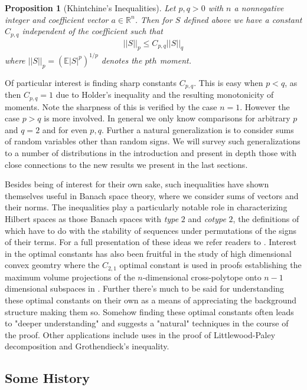 \documentclass[10pt]{article}
\newcommand{\E}{\mathbb{E}}
\newcommand{\1}{\textbf{1}}
\newcommand{\R}{\mathbb{R}}
\newcommand{\norm}[1]{\left\lvert\left\lvert#1\right\rvert\right\rvert}
\newcommand{\normOne}[1]{\left\lvert#1\right\rvert}
\newcommand{\lparen}{\left(}
\newcommand{\rparen}{\right)}
\newtheorem{prop}{Proposition}[subsection]
\theoremstyle{remark}
\theoremstyle{definition}
\begin{document}
\begin{prop}[Khintchine's Inequalities]

	Let $p,q > 0$ with $n$ a nonnegative integer and coefficient vector $a \in \R^n$. Then for $S$ defined above we have a constant $C_{p,q}$ independent of the coefficient such that
	\begin{align*}
		\norm{S}_p \leq C_{p,q} \norm{S}_q
	\end{align*}
	where $\norm{S}_p = \lparen\E\normOne{S}^p\rparen^{1/p}$ denotes the $pth$ moment.
\end{prop}

Of particular interest is finding sharp constants $C_{p,q}$. This is easy when $p < q$, as then $C_{p,q} = 1$ due to Holder's inequality and the resulting monotonicity of moments. Note the sharpness of this is verified by the case $n=1$. However the case $p > q$ is more involved. In general we only know comparisons for arbitrary $p$ and $q=2$ and for even $p,q$. Further a natural generalization is to consider sums of random variables other than random signs. We will survey such generalizations to a number of distributions in the introduction and present in depth those with close connections to the new results we present in the last sections. 


Besides being of interest for their own sake, such inequalities have shown themselves useful in Banach space theory, where we consider sums of vectors and their norms. The inequalities play a particularly notable role in characterizing Hilbert spaces as those Banach spaces with \textit{type} $2$ and \textit{cotype} $2$, the definitions of which have to do with the stability of sequences under permutations of the signs of their terms. For a full presentation of these ideas we refer readers to \cite{LT}. Interest in the optimal constants has also been fruitful in the study of high dimensional convex geomtry where the $C_{2,1}$ optimal constant is used in proofs establishing the maximum volume projections of the $n$-dimensional cross-polytope onto $n-1$ dimensional subspaces in \cite{BN}. Further there's much to be said for understanding these optimal constants on their own as a means of appreciating the background structure making them so. Somehow finding these optimal constants often leads to "deeper understanding" and suggests a "natural" techniques in the course of the proof. Other applications include uses in the proof of Littlewood-Paley decomposition and Grothendieck's inequality.

\subsection{Some History}
\end{document}

